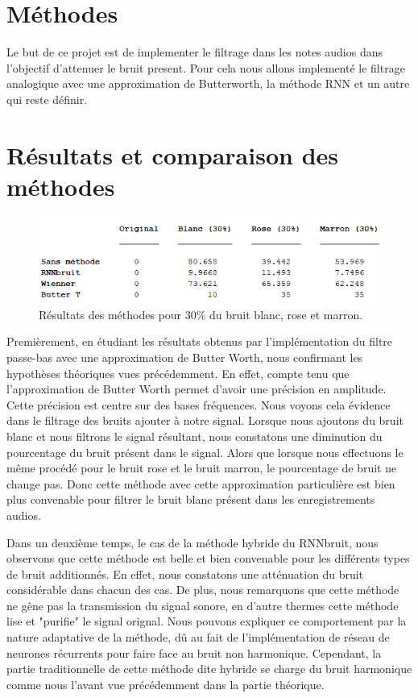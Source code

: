 \documentclass[conference,onecolumn]{IEEEtran}
\begin{document}
\section{Méthodes}
Le but de ce projet est de implementer le filtrage dans les notes audios dans l'objectif d'attenuer le bruit present. Pour cela nous allons implementé le filtrage analogique avec une approximation de Butterworth, la méthode RNN et un autre qui reste définir.

\section{Résultats et comparaison des méthodes}

\begin{figure}[htp]
    \centering
    \includegraphics[width=15cm]{Tabla.png}
    \caption{Résultats des méthodes pour 30\% du bruit blanc, rose et marron.}
    \label{fig:Résultats}
\end{figure}

Premièrement, en étudiant les résultats obtenus par l'implémentation du filtre passe-bas avec une approximation de Butter Worth, nous confirmant les hypothèses théoriques vues précédemment. En effet, compte tenu que l’approximation de Butter Worth permet d’avoir une précision en amplitude. Cette précision est centre sur des bases fréquences. Nous voyons cela évidence dans le filtrage des bruits ajouter à notre signal. Lorsque nous ajoutons du bruit blanc et nous filtrons le signal résultant, nous constatons une diminution du pourcentage du bruit présent dans le signal. Alors que lorsque nous effectuons le même procédé pour le bruit rose et le bruit marron, le pourcentage de bruit ne change pas. Donc cette méthode avec cette approximation particulière est bien plus convenable pour filtrer le bruit blanc présent dans les enregistrements audios.

Dans un deuxième temps, le cas de la méthode hybride du RNNbruit, nous observons que cette méthode est belle et bien convenable pour les différents types de bruit additionnés. En effet, nous constatons une atténuation du bruit considérable dans chacun des cas. De plus, nous remarquons que cette méthode ne gêne pas la transmission du signal sonore, en d'autre thermes cette méthode lise et "purifie" le signal orignal. Nous pouvons expliquer ce comportement par la nature adaptative de la méthode, dû au fait de l'implémentation de réseau de neurones récurrents pour faire face au bruit non harmonique. Cependant, la partie traditionnelle de cette méthode dite hybride se charge du bruit harmonique comme nous l'avant vue précédemment dans la partie théorique.
\end{document}
